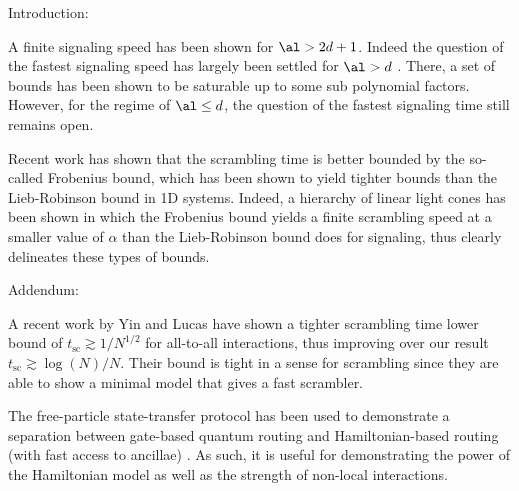 Introduction:

A finite signaling speed has been shown for $\al > 2d+1$. Indeed the question of the fastest signaling speed has largely been settled for $\al > d$ \cite{Tran...}. There, a set of bounds has been shown to be saturable up to some sub polynomial factors. However, for the regime of $\al \le d$, the question of the fastest signaling time still remains open.

Recent work has shown that the scrambling time is better bounded by the so-called Frobenius bound, which has been shown to yield tighter bounds than the Lieb-Robinson bound in 1D systems. Indeed, a hierarchy of linear light cones has been shown in which the Frobenius bound yields a finite scrambling speed at a smaller value of $\alpha$ than the Lieb-Robinson bound does for signaling, thus clearly delineates these types of bounds.

Addendum:

A recent work by Yin and Lucas have shown a tighter scrambling time lower bound of $t_{\text{sc}}\gtrsim 1/N^{1/2}$ for all-to-all interactions, thus improving over our result $t_{\text{sc}}\gtrsim \log(N)/N$. Their bound is tight in a sense for scrambling since they are able to show a minimal model that gives a fast scrambler.

The free-particle state-transfer protocol has been used to demonstrate a separation between gate-based quantum routing and Hamiltonian-based routing (with fast access to ancillae) \cite{Bapat2022}. As such, it is useful for demonstrating the power of the Hamiltonian model as well as the strength of non-local interactions.
